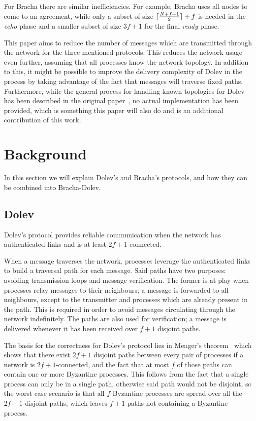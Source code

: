 For Bracha there are similar inefficiencies. For example, Bracha uses all nodes to come to an agreement, while only a subset of size $\lceil\frac{N+f+1}{2}\rceil + f$ is needed in the \textit{echo} phase and a smaller subset of size $3f+1$ for the final \textit{ready} phase.


This paper aims to reduce the number of messages which are transmitted through the network for the three mentioned protocols. This reduces the network usage even further, assuming that all processes know the network topology. In addition to this, it might be possible to improve the delivery complexity of Dolev in the process by taking advantage of the fact that messages will traverse fixed paths. Furthermore, while the general process for handling known topologies for Dolev has been described in the original paper~\cite{dolev}, no actual implementation has been provided, which is something this paper will also do and is an additional contribution of this work.


\section{Background}
\label{background}
In this section we will explain Dolev's and Bracha's protocols, and how they can be combined into Bracha-Dolev.

\subsection*{Dolev}
Dolev's protocol provides reliable communication when the network has authenticated links and is at least $2f+1$-connected.

When a message traverses the network, processes leverage the authenticated links to build a traversal path for each message. Said paths have two purposes: avoiding transmission loops and message verification. 
The former is at play when processes relay messages to their neighbours; a message is forwarded to all neighbours, except to the transmitter and processes which are already present in the path. This is required in order to avoid messages circulating through the network indefinitely.
The paths are also used for verification; a message is delivered whenever it has been received over $f+1$ disjoint paths.

The basis for the correctness for Dolev's protocol lies in Menger's theorem~\cite{menger} which shows that there exist $2f+1$ disjoint paths between every pair of processes if a network is $2f+1$-connected, and the fact that at most $f$ of those paths can contain one or more Byzantine processes. This follows from the fact that a single process can only be in a single path, otherwise said path would not be disjoint, so the worst case scenario is that all $f$ Byzantine processes are spread over all the $2f+1$ disjoint paths, which leaves $f+1$ paths not containing a Byzantine process.


